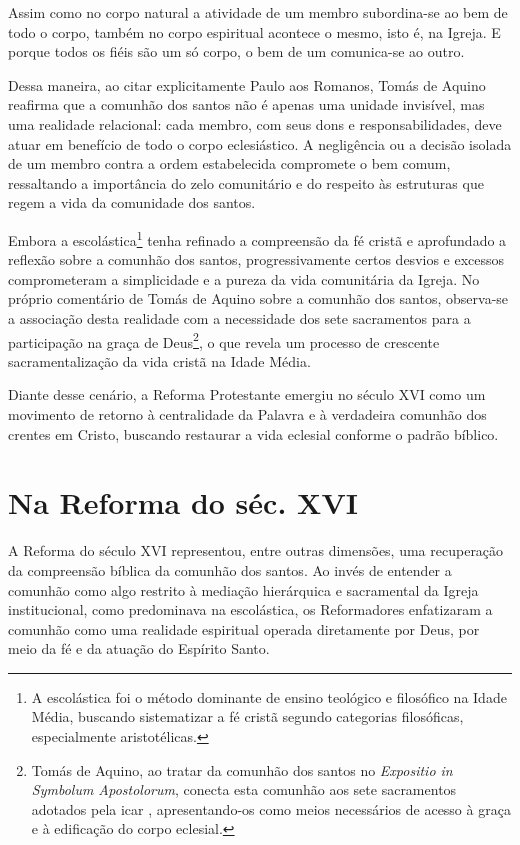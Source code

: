 \begin{citacao}
    Assim como no corpo natural a atividade de um membro subordina-se ao bem de todo o corpo, também no corpo espiritual acontece o mesmo, isto é, na Igreja. E porque todos os fiéis são um só corpo, o bem de um comunica-se ao outro. \cite[p.~79]{aquinoCredo2004}
\end{citacao}

Dessa maneira, ao citar explicitamente Paulo aos Romanos, Tomás de Aquino reafirma que a comunhão dos santos não é apenas uma unidade invisível, mas uma realidade relacional: cada membro, com seus dons e responsabilidades, deve atuar em benefício de todo o corpo eclesiástico. A negligência ou a decisão isolada de um membro contra a ordem estabelecida compromete o bem comum, ressaltando a importância do zelo comunitário e do respeito às estruturas que regem a vida da comunidade dos santos.

Embora a escolástica\footnote{A escolástica foi o método dominante de ensino teológico e filosófico na Idade Média, buscando sistematizar a fé cristã segundo categorias filosóficas, especialmente aristotélicas.} tenha refinado a compreensão da fé cristã e aprofundado a reflexão sobre a comunhão dos santos, progressivamente certos desvios e excessos comprometeram a simplicidade e a pureza da vida comunitária da Igreja. No próprio comentário de Tomás de Aquino sobre a comunhão dos santos, observa-se a associação desta realidade com a necessidade dos sete sacramentos para a participação na graça de Deus\footnote{Tomás de Aquino, ao tratar da comunhão dos santos no \textit{\foreignlanguage{latin}{Expositio in Symbolum Apostolorum}}, conecta esta comunhão aos sete sacramentos adotados pela \gls{icar} \cite{aquinoCredo2004}, apresentando-os como meios necessários de acesso à graça e à edificação do corpo eclesial.}, o que revela um processo de crescente sacramentalização da vida cristã na Idade Média.

Diante desse cenário, a Reforma Protestante emergiu no século XVI como um movimento de retorno à centralidade da Palavra e à verdadeira comunhão dos crentes em Cristo, buscando restaurar a vida eclesial conforme o padrão bíblico.

\section{Na Reforma do séc. XVI}

A Reforma do século XVI representou, entre outras dimensões, uma recuperação da compreensão bíblica da comunhão dos santos. Ao invés de entender a comunhão como algo restrito à mediação hierárquica e sacramental da Igreja institucional, como predominava na escolástica, os Reformadores enfatizaram a comunhão como uma realidade espiritual operada diretamente por Deus, por meio da fé e da atuação do Espírito Santo.

